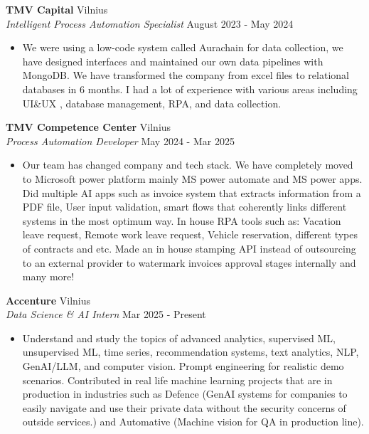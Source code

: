 \documentclass[a4paper]{article}
\begin{document}
\textbf{TMV Capital} \hfill Vilnius\\
\textit{Intelligent Process Automation Specialist} \hfill August 2023 - May 2024\\
\vspace{-1mm}
\begin{itemize} \itemsep 1pt
	\item We were using a low-code system called Aurachain for data collection, we have designed interfaces and maintained our own data pipelines with MongoDB. We have transformed the company from excel files to relational databases in 6 months. I had a lot of experience with various areas including UI\&UX , database management, RPA, and data collection.
\end{itemize}
\textbf{TMV Competence Center} \hfill Vilnius\\
\textit{Process Automation Developer} \hfill May 2024 - Mar 2025\\
\vspace{-1mm}
\begin{itemize} \itemsep 1pt
	\item Our team has changed company and tech stack. We have completely moved to Microsoft power platform mainly MS power automate and MS power apps. Did multiple AI apps such as invoice system that extracts information from a PDF file, User input validation, smart flows that coherently links different systems in the most optimum way. In house RPA tools such as: Vacation leave request, Remote work leave request, Vehicle reservation, different types of contracts and etc. Made an in house stamping API instead of outsourcing to an external provider to watermark invoices approval stages internally and many more!
\end{itemize}
\textbf{Accenture} \hfill Vilnius\\
\textit{Data Science \& AI Intern} \hfill Mar 2025 - Present\\
\vspace{-1mm}
\begin{itemize} \itemsep 1pt
	\item Understand and study the topics of advanced analytics, supervised ML, unsupervised ML, time series, recommendation systems, text analytics, NLP, GenAI/LLM, and computer vision. Prompt engineering for realistic demo scenarios. Contributed in real life machine learning projects that are in production in industries such as Defence (GenAI systems for companies to easily navigate and use their private data without the security concerns of outside services.) and Automative (Machine vision for QA in production line).
\end{itemize}
\end{document}
